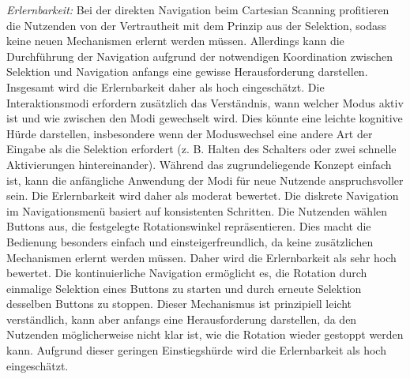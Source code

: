 \textit{Erlernbarkeit:} 
Bei der direkten Navigation beim Cartesian Scanning profitieren die Nutzenden von der Vertrautheit mit dem Prinzip aus der Selektion, sodass keine neuen Mechanismen erlernt werden müssen. Allerdings kann die Durchführung der Navigation aufgrund der notwendigen Koordination zwischen Selektion und Navigation anfangs eine gewisse Herausforderung darstellen. Insgesamt wird die Erlernbarkeit daher als hoch eingeschätzt. Die Interaktionsmodi erfordern zusätzlich das Verständnis, wann welcher Modus aktiv ist und wie zwischen den Modi gewechselt wird. Dies könnte eine leichte kognitive Hürde darstellen, insbesondere wenn der Moduswechsel eine andere Art der Eingabe als die Selektion erfordert (z. B. Halten des Schalters oder zwei schnelle Aktivierungen hintereinander). Während das zugrundeliegende Konzept einfach ist, kann die anfängliche Anwendung der Modi für neue Nutzende anspruchsvoller sein. Die Erlernbarkeit wird daher als moderat bewertet.
Die diskrete Navigation im Navigationsmenü basiert auf konsistenten Schritten. Die Nutzenden wählen Buttons aus, die festgelegte Rotationswinkel repräsentieren. Dies macht die Bedienung besonders einfach und einsteigerfreundlich, da keine zusätzlichen Mechanismen erlernt werden müssen. Daher wird die Erlernbarkeit als sehr hoch bewertet.
Die kontinuierliche Navigation ermöglicht es, die Rotation durch einmalige Selektion eines Buttons zu starten und durch erneute Selektion desselben Buttons zu stoppen. Dieser Mechanismus ist prinzipiell leicht verständlich, kann aber anfangs eine Herausforderung darstellen, da den Nutzenden möglicherweise nicht klar ist, wie die Rotation wieder gestoppt werden kann. Aufgrund dieser geringen Einstiegshürde wird die Erlernbarkeit als hoch eingeschätzt.

